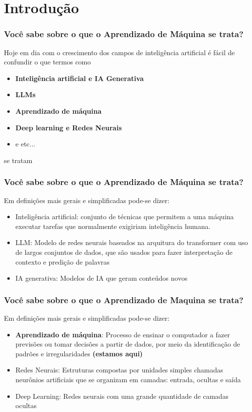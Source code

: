 \section{Introdução} %


\begin{frame}
	\frametitle{Você sabe sobre o que o Aprendizado de Máquina se trata?}
    Hoje em dia com o crescimento dos campos de inteligência artificial é fácil de confundir o que termos como 
    \begin{itemize}
        \item \textbf{Inteligência artificial e IA Generativa}
        \item \textbf{LLMs}
        \item \textbf{Aprendizado de máquina}
        \item \textbf{Deep learning e Redes Neurais}
        \item  e etc...
    \end{itemize}    
    se tratam
\end{frame}
\begin{frame}
	\frametitle{Você sabe sobre o que o Aprendizado de Máquina se trata?}
    Em definições mais gerais e simplificadas pode-se dizer:
    \vspace{0.2cm}
    \begin{itemize}
        \item Inteligência artificial:  conjunto de técnicas que permitem a uma máquina executar tarefas que normalmente exigiriam inteligência humana.
        \item LLM: Modelo de redes neurais baseados na arquitura do transformer com uso de largos conjuntos de dados, que são usados para fazer interpretação de contexto e predição de palavras
        \item IA generativa: Modelos de IA que geram conteúdos novos
    \end{itemize}
\end{frame}
\begin{frame}
	\frametitle{Você sabe sobre o que o Aprendizado de Maquina se trata?}
    Em definições mais gerais e simplificadas pode-se dizer:
    \vspace{0.2cm}
    \begin{itemize}
        \item \textbf{Aprendizado de máquina}: Processo de ensinar o computador a fazer previsões ou tomar decisões a partir de dados, por meio da identificação de padrões e irregularidades \textbf{(estamos aqui)}
        \item Redes Neurais: Estruturas compostas por unidades simples chamadas neurônios artificiais que se organizam em camadas: entrada, ocultas e saída 
        \item Deep Learning: Redes neurais com uma grande quantidade de camadas ocultas
    \end{itemize}
\end{frame}
